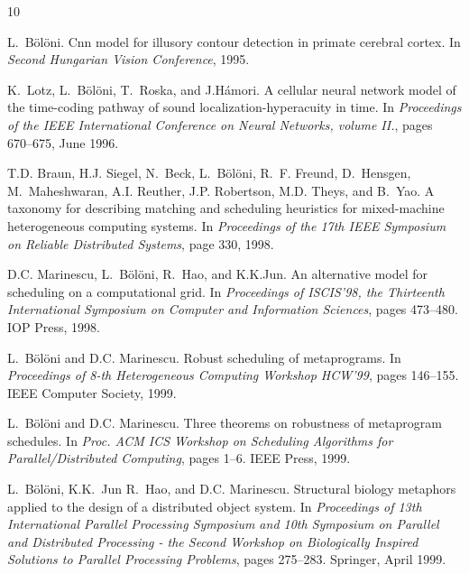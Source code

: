\begin{thebibliography}{10}

L.~B{\"o}l{\"o}ni.
\newblock Cnn model for illusory contour detection in primate cerebral cortex.
\newblock In {\em Second Hungarian Vision Conference}, 1995.

K.~Lotz, L.~B{\"o}l{\"o}ni, T.~Roska, and J.H{\'a}mori.
\newblock A cellular neural network model of the time-coding pathway of sound
  localization-hyperacuity in time.
\newblock In {\em Proceedings of the IEEE International Conference on Neural
  Networks, volume II.}, pages 670--675, June 1996.

T.D. Braun, H.J. Siegel, N.~Beck, L.~B{\"o}l{\"o}ni, R.~F. Freund, D.~Hensgen,
  M.~Maheshwaran, A.I. Reuther, J.P. Robertson, M.D. Theys, and B.~Yao.
\newblock A taxonomy for describing matching and scheduling heuristics for
  mixed-machine heterogeneous computing systems.
\newblock In {\em Proceedings of the 17th IEEE Symposium on Reliable
  Distributed Systems}, page 330, 1998.

D.C. Marinescu, L.~B{\"o}l{\"o}ni, R.~Hao, and K.K.Jun.
\newblock An alternative model for scheduling on a computational grid.
\newblock In {\em Proceedings of {ISCIS'98}, the Thirteenth International
  Symposium on Computer and Information Sciences}, pages 473--480. IOP Press,
  1998.

L.~B{\"o}l{\"o}ni and D.C. Marinescu.
\newblock Robust scheduling of metaprograms.
\newblock In {\em Proceedings of 8-th Heterogeneous Computing Workshop HCW'99},
  pages 146--155. IEEE Computer Society, 1999.

L.~B{\"o}l{\"o}ni and D.C. Marinescu.
\newblock Three theorems on robustness of metaprogram schedules.
\newblock In {\em Proc. ACM ICS Workshop on Scheduling Algorithms for
  Parallel/Distributed Computing}, pages 1--6. IEEE Press, 1999.

L.~B{\"o}l{\"o}ni, K.K.~Jun R.~Hao, and D.C. Marinescu.
\newblock Structural biology metaphors applied to the design of a distributed
  object system.
\newblock In {\em Proceedings of 13th International Parallel Processing
  Symposium and 10th Symposium on Parallel and Distributed Processing - the
  Second Workshop on Biologically Inspired Solutions to Parallel Processing
  Problems}, pages 275--283. Springer, April 1999.


\end{thebibliography}
